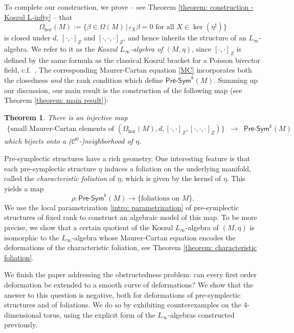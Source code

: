 \documentclass[11pt,thmsa]{amsart}
\newtheorem*{thm*}{Theorem}
\theoremstyle{definition}
\newcommand{\Presym}{\mathsf{Pre}\textrm{-}\mathsf{Sym}}
\newcommand{\hor}{\mathrm{hor}}
\begin{document}
To complete our construction, we prove -- see Theorem \ref{theorem: construction - Koszul L-infty} -- that 
$$\Omega_\hor(M):=\{\beta \in \Omega(M) \, | \, \iota_X\beta=0 \text{ for all }X\in \ker(\eta^\sharp)\}$$
is closed under $d$, $[\cdot,\cdot]_Z$ and $[\cdot,\cdot,\cdot]_Z$, and hence inherits the structure of an $L_\infty$-algebra. We refer to it as the {\em Koszul $L_\infty$-algebra of $(M,\eta)$}, since $[\cdot,\cdot]_Z$ is defined by the same formula as the classical Koszul bracket for a Poisson bivector field, c.f.~\cite{Koszul}.
The corresponding Maurer-Cartan equation \eqref{MC} incorporates both the closedness {\em and} the rank condition which define $\Presym^k(M)$. Summing up our discussion,   
our main result is the construction of the following map (see Theorem \ref{theorem: main result}):
\begin{thm*}
There is an injective map
\begin{align}\label{intro: parametrization} \boxed{\{\textrm{small Maurer-Cartan elements of } (\Omega_\hor(M),d,[\cdot,\cdot]_Z,[\cdot,\cdot,\cdot]_Z)\} \;\;{\longrightarrow}\;\; \Presym^k(M)}
\end{align}
which bijects onto a ($\mathcal{C}^0$-)neighborhood of $\eta$.
\end{thm*}






 

Pre-symplectic structures have a rich geometry. One interesting feature is that each pre-symplectic structure $\eta$ induces a foliation on the underlying manifold, called the {\em characteristic foliation} of $\eta$, which is given by the kernel of $\eta$. This yields a map
$$\rho: \Presym^k(M) \to \{\textrm{foliations on } M\}.$$
We use the local parametrization \eqref{intro: parametrization}
of pre-symplectic structures of fixed rank
 to construct an algebraic model of this map. To be more precise, we show that a certain quotient of the Koszul $L_\infty$-algebra of $(M,\eta)$
is isomorphic to the $L_\infty$-algebra whose Maurer-Cartan equation encodes the deformations of the characteristic foliation, see Theorem \ref{theorem: characteristic foliation}.  

We finish the paper addressing the obstructedness problem: can every first order deformation be extended to a smooth curve of deformations? We show that the answer to this question is negative, both for deformations of pre-symplectic structures and of foliations. We do so by exhibiting counterexamples on the 4-dimensional torus, using the explicit form of the  $L_\infty$-algebras constructed previously.\\
 
\end{document}
